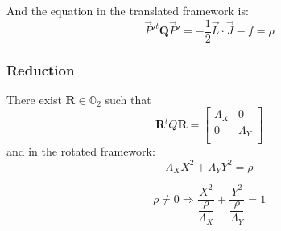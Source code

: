 \documentclass[aps,12pt]{revtex4}
\begin{document}
And the equation in the translated framework is:
\begin{equation}
	\vec{P}'^t \bm{Q} \vec{P}'= - \dfrac{1}{2} \vec{L}\cdot\vec{J} - f = \rho
\end{equation}

\subsubsection{Reduction}
There exist $\bm{R}\in\mathbb{O}_2$ such that
\begin{equation}
\bm{R}^tQ\bm{R} = \begin{bmatrix}
\Lambda_X & 0 \\
0         & \Lambda_Y\\
\end{bmatrix}
\end{equation}
and in the rotated framework:
\begin{equation}
\Lambda_X X^2 + \Lambda_Y Y^2 = \rho
\end{equation}

\begin{equation}
	\rho\not=0 \Rightarrow \dfrac{X^2}{\dfrac{\rho}{\Lambda_X}} + \dfrac{Y^2}{\dfrac{\rho}{\Lambda_Y}} = 1
\end{equation}
\end{document}
